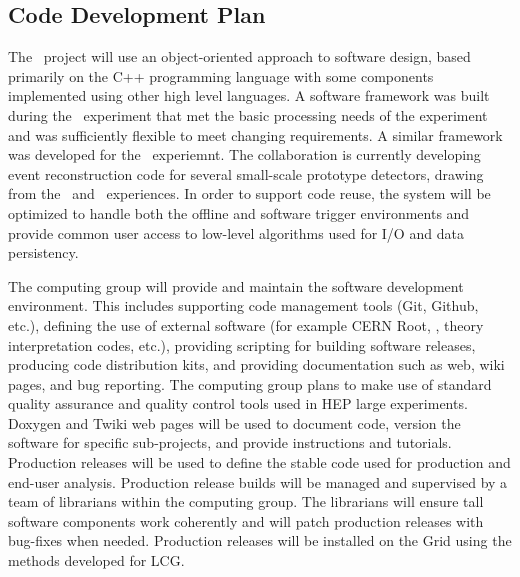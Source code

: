 \subsection{Code Development Plan}

The \DSk\ project will use an object-oriented approach to software design, based primarily on the C++ programming language with some components implemented using other high level languages. A software framework was built during the \DSf\ experiment that met the basic processing needs of the experiment and was sufficiently flexible to meet changing requirements. A similar framework was developed for the \DEAP\ experiemnt. The collaboration is currently developing event reconstruction code for several small-scale prototype detectors, drawing from the \DSf\ and \DEAP\ experiences. In order to support code reuse, the system will be optimized to handle both the offline and software trigger environments and provide common user access to low-level algorithms used for I/O and data persistency.


The computing group will provide and maintain the software development environment. This includes supporting code management tools (Git, Github, etc.), defining the use of external software (for example CERN Root, \Geant, theory interpretation codes, etc.), providing scripting for building software releases, producing code distribution kits, and providing documentation such as web, wiki pages, and bug reporting. The computing group plans to make use of standard quality assurance and quality control tools used in HEP large experiments. Doxygen and Twiki web pages will be used to document code, version the software for specific sub-projects, and provide instructions and tutorials. Production releases will be used to define the stable code used for production and end-user analysis. Production release builds will be managed and supervised by a team of librarians within the computing group. The librarians will ensure tall software components work coherently and will patch production releases with bug-fixes when needed. Production releases will be installed on the Grid using the methods developed for LCG.


